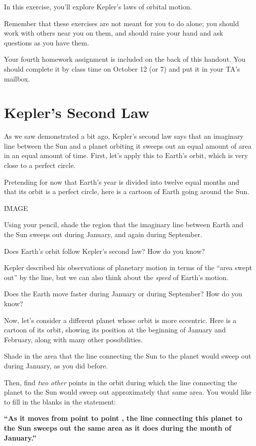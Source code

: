 \documentclass[12pt]{article}
\begin{document}
\Large
\centerline{}

\normalsize

In this exercise, you'll explore Kepler's laws of orbital motion.

Remember that these exercises are not meant for you to do alone; you should work with others near you on them, and should raise your hand and ask questions as you have them.

Your fourth homework assignment is included on the back of this handout. You should complete it by class time on October 12 (or 7) and put it in your TA's mailbox.

\section{Kepler's Second Law}

As we saw demonstrated a bit ago, Kepler's second law says that an imaginary line between the Sun and a planet orbiting it sweeps out an equal amount of area in an equal amount of time. First, let's apply this to Earth's orbit, which is very close to a perfect circle.

Pretending for now that Earth's year is divided into twelve equal months and that its orbit is a perfect circle, here is a cartoon of Earth going around the Sun.

IMAGE

Using your pencil, shade the region that the imaginary line between Earth and the Sun sweeps out during January, and again during September.

Does Earth's orbit follow Kepler's second law? How do you know? 

\vspace{2in}

Kepler described his observations of planetary motion in terms of the ``area swept out'' by the line, but we can also think about the {\it speed} of Earth's motion.

Does the Earth move faster during January or during September? How do you know?

\newpage

Now, let's consider a different planet whose orbit is more eccentric. Here is a cartoon of its orbit, showing its position at the beginning of January and February, along with many other possibilities. 

Shade in the area that the line connecting the Sun to the planet would sweep out during January, as you did before.


Then, find {\it two other} points in the orbit during which the line connecting the planet to the Sun would sweep out approximately that same area. You would like to fill in the blanks in the statement:


\bf ``As it moves from point \underline{\hspace{0.5in}} to point \underline{\hspace{0.5in}}, the line connecting this planet to the Sun sweeps out the same area as it does during the month of January.''


	
	
\end{document}
